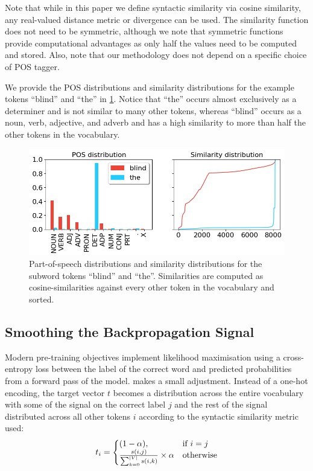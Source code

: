 Note that while in this paper we define syntactic similarity via cosine similarity, any real-valued distance metric or divergence can be used. The similarity function does not need to be symmetric, although we note that symmetric functions provide computational advantages as only half the values need to be computed and stored. Also, note that our methodology does not depend on a specific choice of POS tagger.

We provide the POS distributions and similarity distributions for the example tokens ``blind'' and ``the'' in \cref{fig:distributions}. Notice that ``the'' occurs almost exclusively as a determiner and is not similar to many other tokens, whereas ``blind'' occurs as a noun, verb, adjective, and adverb and has a high similarity to more than half the other tokens in the vocabulary.

\begin{figure}[ht!]
    \centering
    \includegraphics[width=0.8\linewidth]{chapters/syntatic-smoothing/figures/distributions.png}
    \caption{Part-of-speech distributions and similarity distributions for the subword tokens ``blind'' and ``the''. Similarities are computed as cosine-similarities against every other token in the vocabulary and sorted.}
    \label{fig:distributions}
    \vspace{-1em}
\end{figure}

\subsection{Smoothing the Backpropagation Signal}\label{section:smoothing}

Modern pre-training objectives implement likelihood maximisation using a cross-entropy loss between the label of the correct word and predicted probabilities from a forward pass of the model. \smoothing makes a small adjustment. Instead of a one-hot encoding, the target vector $t$ becomes a distribution across the entire vocabulary with some of the signal on the correct label $j$ and the rest of the signal distributed across all other tokens $i$ according to the syntactic similarity metric used:
\begin{equation}
\label{eq:signal-distribution}
    t_i=\left\{
  \begin{array}{@{}ll@{}}
    (1-\alpha), & \text{if}\ i=j \\
    \frac{s(i,j)}{\sum_{k=0}^{|V|}{s(i,k)}} \times \alpha & \text{otherwise}
  \end{array}\right.
\end{equation}


